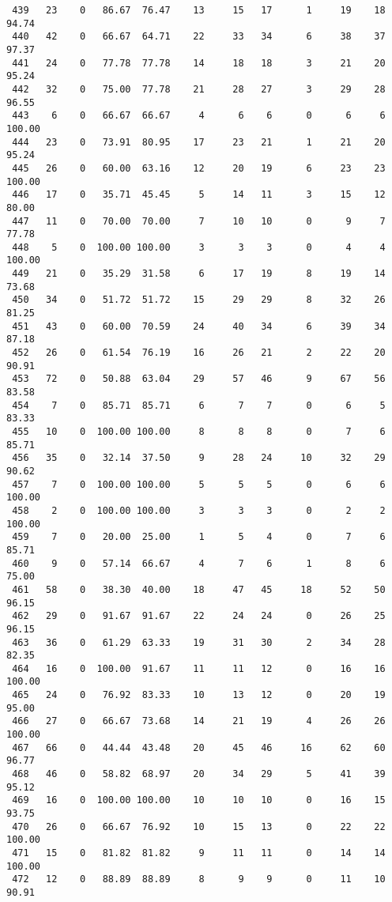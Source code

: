 \begin{verbatim}
 439   23    0   86.67  76.47    13     15   17      1     19    18    94.74
 440   42    0   66.67  64.71    22     33   34      6     38    37    97.37
 441   24    0   77.78  77.78    14     18   18      3     21    20    95.24
 442   32    0   75.00  77.78    21     28   27      3     29    28    96.55
 443    6    0   66.67  66.67     4      6    6      0      6     6   100.00
 444   23    0   73.91  80.95    17     23   21      1     21    20    95.24
 445   26    0   60.00  63.16    12     20   19      6     23    23   100.00
 446   17    0   35.71  45.45     5     14   11      3     15    12    80.00
 447   11    0   70.00  70.00     7     10   10      0      9     7    77.78
 448    5    0  100.00 100.00     3      3    3      0      4     4   100.00
 449   21    0   35.29  31.58     6     17   19      8     19    14    73.68
 450   34    0   51.72  51.72    15     29   29      8     32    26    81.25
 451   43    0   60.00  70.59    24     40   34      6     39    34    87.18
 452   26    0   61.54  76.19    16     26   21      2     22    20    90.91
 453   72    0   50.88  63.04    29     57   46      9     67    56    83.58
 454    7    0   85.71  85.71     6      7    7      0      6     5    83.33
 455   10    0  100.00 100.00     8      8    8      0      7     6    85.71
 456   35    0   32.14  37.50     9     28   24     10     32    29    90.62
 457    7    0  100.00 100.00     5      5    5      0      6     6   100.00
 458    2    0  100.00 100.00     3      3    3      0      2     2   100.00
 459    7    0   20.00  25.00     1      5    4      0      7     6    85.71
 460    9    0   57.14  66.67     4      7    6      1      8     6    75.00
 461   58    0   38.30  40.00    18     47   45     18     52    50    96.15
 462   29    0   91.67  91.67    22     24   24      0     26    25    96.15
 463   36    0   61.29  63.33    19     31   30      2     34    28    82.35
 464   16    0  100.00  91.67    11     11   12      0     16    16   100.00
 465   24    0   76.92  83.33    10     13   12      0     20    19    95.00
 466   27    0   66.67  73.68    14     21   19      4     26    26   100.00
 467   66    0   44.44  43.48    20     45   46     16     62    60    96.77
 468   46    0   58.82  68.97    20     34   29      5     41    39    95.12
 469   16    0  100.00 100.00    10     10   10      0     16    15    93.75
 470   26    0   66.67  76.92    10     15   13      0     22    22   100.00
 471   15    0   81.82  81.82     9     11   11      0     14    14   100.00
 472   12    0   88.89  88.89     8      9    9      0     11    10    90.91

\end{verbatim}
